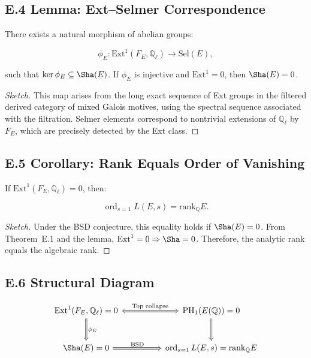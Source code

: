 \subsection*{E.4 Lemma: Ext--Selmer Correspondence}

\begin{lemma}
There exists a natural morphism of abelian groups:

\[
\phi_E : \mathrm{Ext}^1(F_E, \mathbb{Q}_\ell) \longrightarrow \mathrm{Sel}(E),
\]

such that \( \ker \phi_E \subseteq \Sha(E) \). If \( \phi_E \) is injective and \( \mathrm{Ext}^1 = 0 \), then \( \Sha(E) = 0 \).
\end{lemma}

\begin{proof}[Sketch]
This map arises from the long exact sequence of Ext groups in the filtered derived category of mixed Galois motives,  
using the spectral sequence associated with the filtration. Selmer elements correspond to nontrivial extensions of \( \mathbb{Q}_\ell \) by \( F_E \),  
which are precisely detected by the Ext class.
\end{proof}

\subsection*{E.5 Corollary: Rank Equals Order of Vanishing}

\begin{corollary}
If \( \mathrm{Ext}^1(F_E, \mathbb{Q}_\ell) = 0 \), then:

\[
\operatorname{ord}_{s=1}L(E, s) = \mathrm{rank}_{\mathbb{Q}} E.
\]
\end{corollary}

\begin{proof}[Sketch]
Under the BSD conjecture, this equality holds if \( \Sha(E) = 0 \).  
From Theorem~E.1 and the lemma, \( \mathrm{Ext}^1 = 0 \Rightarrow \Sha = 0 \).  
Therefore, the analytic rank equals the algebraic rank.
\end{proof}

\subsection*{E.6 Structural Diagram}

\[
\begin{tikzcd}[row sep=large, column sep=huge]
\mathrm{Ext}^1(F_E, \mathbb{Q}_\ell) = 0 \arrow[r, Leftrightarrow, "\text{Top collapse}"] \arrow[d, Rightarrow, "\phi_E"] & 
\mathrm{PH}_1(E(\mathbb{Q})) = 0 \arrow[d, Rightarrow] \\
\Sha(E) = 0 \arrow[r, Rightarrow, "\text{BSD}"] & \operatorname{ord}_{s=1}L(E,s) = \mathrm{rank}_\mathbb{Q}E
\end{tikzcd}
\]

